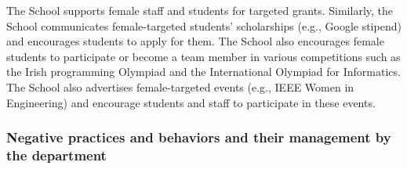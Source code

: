 The School supports female staff and students for targeted grants. Similarly, the School communicates female-targeted students' scholarships (e.g., Google stipend) and encourages  students to apply for them. The School also encourages female students to participate or become a team member in various competitions such as the Irish programming Olympiad and the International Olympiad for Informatics.  
The School also advertises female-targeted events (e.g., IEEE Women in Engineering) and encourage students and staff to participate in these events.  


\subsubsection{Negative practices and behaviors and their management by the department}





